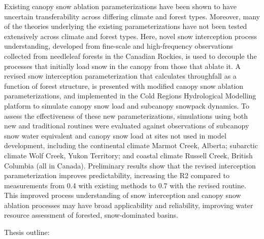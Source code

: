 \documentclass[
  letterpaper,
  DIV=11,
  numbers=noendperiod]{scrartcl}
\begin{document}
Existing canopy snow ablation parameterizations have been shown to have
uncertain transferability across differing climate and forest types.
Moreover, many of the theories underlying the existing parameterizations
have not been tested extensively across climate and forest types. Here,
novel snow interception process understanding, developed from fine-scale
and high-frequency observations collected from needleleaf forests in the
Canadian Rockies, is used to decouple the processes that initially load
snow in the canopy from those that ablate it. A revised snow
interception parameterization that calculates throughfall as a function
of forest structure, is presented with modified canopy snow ablation
parameterizations, and implemented in the Cold Regions Hydrological
Modelling platform to simulate canopy snow load and subcanopy snowpack
dynamics. To assess the effectiveness of these new parameterizations,
simulations using both new and traditional routines were evaluated
against observations of subcanopy snow water equivalent and canopy snow
load at sites not used in model development, including the continental
climate Marmot Creek, Alberta; subarctic climate Wolf Creek, Yukon
Territory; and coastal climate Russell Creek, British Columbia (all in
Canada). Preliminary results show that the revised interception
parameterization improves predictability, increasing the R2 compared to
measurements from 0.4 with existing methods to 0.7 with the revised
routine. This improved process understanding of snow interception and
canopy snow ablation processes may have broad applicability and
reliability, improving water resource assessment of forested,
snow-dominated basins.

Thesis outline:
\end{document}
